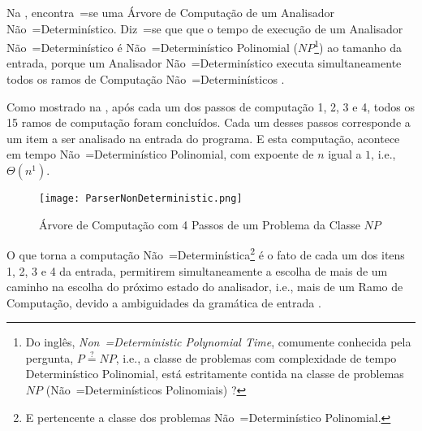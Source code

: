 
Na ,
encontra~=se uma Árvore de Computação de um Analisador Não~=Determinístico.
Diz~=se que que o tempo de execução de um Analisador Não~=Determinístico é Não~=Determinístico Polinomial ($NP$\footnote{
Do inglês, \textit{Non~=Deterministic Polynomial Time},
comumente conhecida pela pergunta,
$P \stackrel{?}{=} NP$, i.e.,
a classe de problemas com complexidade de tempo Determinístico Polinomial,
está estritamente contida na classe de problemas $NP$ (Não~=Determinísticos Polinomiais) \cite{computationalComplexityAuroraBarak}?
})
ao tamanho da entrada,
porque um Analisador Não~=Determinístico executa simultaneamente todos os ramos de Computação Não~=Determinísticos \cite{hopcroftBook}.

Como mostrado na ,
após cada um dos passos de computação 1,
2, 3 e 4,
todos os 15 ramos de computação foram concluídos.
Cada um desses passos corresponde a um item a ser analisado na entrada do programa.
E esta computação,
acontece em tempo Não~=Determinístico Polinomial,
com expoente de $n$ igual a $1$,
i.e.,
$\Theta(n^1)$.
\begin{figure}[!htb]
\caption{Árvore de Computação com 4 Passos\protect\footnotemark{} de um Problema da Classe $NP$}
\label{ParserNonDeterministic}
\centering
\texttt{[image: ParserNonDeterministic.png]}
\end{figure}

O que torna a computação Não~=Determinística\footnote{
E pertencente a classe dos problemas Não~=Determinístico Polinomial.
} é o fato de cada um dos itens 1,
2, 3 e 4 da entrada,
permitirem simultaneamente a escolha de mais de um caminho na escolha do próximo estado do analisador,
i.e.,
mais de um Ramo de Computação,
devido a ambiguidades da gramática de entrada \cite{detectingAmbiguityInGrammars,antlrBookTerrentParr}.


